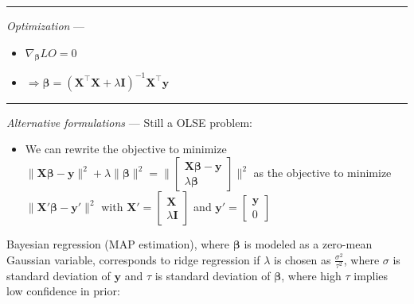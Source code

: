 {\color{lightgray}\hrule height 0.001mm}

\emph{Optimization} ---
\begin{itemize}
    \item $\nabla_{\boldsymbol{\beta}} LO = 0$
    \item $\Rightarrow \boldsymbol{\beta} = (\boldsymbol{X}^\intercal \boldsymbol{X} + \lambda \boldsymbol{I})^{-1}  \boldsymbol{X}^\intercal \boldsymbol{y}$
\end{itemize}

{\color{lightgray}\hrule height 0.001mm}

\emph{Alternative formulations} --- 
Still a OLSE problem:
\begin{itemize}
    \item We can rewrite the objective to minimize $\|\boldsymbol{X}\boldsymbol{\beta} - \boldsymbol{y}\|^2 + \lambda\|\boldsymbol{\beta}\|^2 = \| \begin{bmatrix} 
    \boldsymbol{X}\boldsymbol{\beta} - \boldsymbol{y} \\
    \lambda \boldsymbol{\beta}
    \end{bmatrix} \|^2$ as the objective to minimize $\|\boldsymbol{X}'\boldsymbol{\beta} - \boldsymbol{y}'\|^2$ with $\boldsymbol{X}' = 
    \begin{bmatrix} 
    \boldsymbol{X} \\
    \lambda \boldsymbol{I}
    \end{bmatrix}$ 
    and $\boldsymbol{y}' = 
    \begin{bmatrix} 
    \boldsymbol{y} \\
    0
    \end{bmatrix}$
\end{itemize}
Bayesian regression (MAP estimation), where $\boldsymbol{\beta}$ is modeled as a zero-mean Gaussian variable, corresponds to ridge regression if $\lambda$ is chosen as $\frac{\sigma^2}{\tau^2}$, where $\sigma$ is standard deviation of $\boldsymbol{y}$ and $\tau$ is standard deviation of $\boldsymbol{\beta}$, where high $\tau$ implies low confidence in prior:
